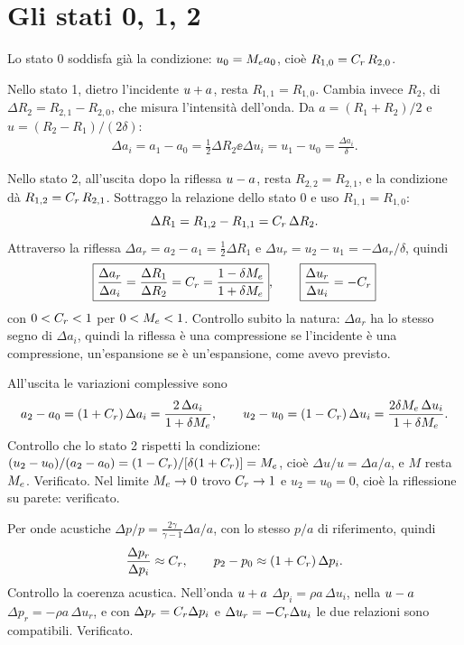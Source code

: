 \section*{Gli stati 0, 1, 2}
Lo stato 0 soddisfa già la condizione: $u_0=M_e a_0$, cioè $R_{1,0}=C_r\,R_{2,0}$.

Nello stato 1, dietro l'incidente $u+a$, resta $R_{1,1}=R_{1,0}$. Cambia invece $R_2$, di $\Delta R_2=R_{2,1}-R_{2,0}$,
che misura l'intensità dell'onda. Da $a=(R_1+R_2)/2$ e $u=(R_2-R_1)/(2\delta)$:
\begin{gather*}
  \Delta a_i=a_1-a_0=\tfrac12\Delta R_2 \ee \Delta u_i=u_1-u_0=\frac{\Delta a_i}{\delta}.
\end{gather*}

Nello stato 2, all'uscita dopo la riflessa $u-a$, resta $R_{2,2}=R_{2,1}$, e la condizione dà $R_{1,2}=C_r\,R_{2,1}$.
Sottraggo la relazione dello stato 0 e uso $R_{1,1}=R_{1,0}$:
\[
  \Delta R_1=R_{1,2}-R_{1,1}=C_r\,\Delta R_2 .
\]
Attraverso la riflessa $\Delta a_r=a_2-a_1=\tfrac12\Delta R_1$ e $\Delta u_r=u_2-u_1=-\Delta a_r/\delta$, quindi
\begin{gather*}
  \boxed{\frac{\Delta a_r}{\Delta a_i}=\frac{\Delta R_1}{\Delta R_2}=C_r=\frac{1-\delta M_e}{1+\delta M_e}}
  ,\qquad \boxed{\frac{\Delta u_r}{\Delta u_i}=-C_r}
\end{gather*}
con $0<C_r<1$ per $0<M_e<1$. Controllo subito la natura: $\Delta a_r$ ha lo stesso segno di $\Delta a_i$, quindi la
riflessa è una compressione se l'incidente è una compressione, un'espansione se è un'espansione, come avevo previsto.

All'uscita le variazioni complessive sono
\begin{gather*}
  a_2-a_0=(1+C_r)\,\Delta a_i=\frac{2\,\Delta a_i}{1+\delta M_e} ,\qquad
  u_2-u_0=(1-C_r)\,\Delta u_i=\frac{2\delta M_e\,\Delta u_i}{1+\delta M_e}.
\end{gather*}
Controllo che lo stato 2 rispetti la condizione: $(u_2-u_0)/(a_2-a_0)=(1-C_r)/[\delta(1+C_r)]=M_e$, cioè
$\Delta u/u=\Delta a/a$, e $M$ resta $M_e$. Verificato. Nel limite $M_e\to0$ trovo $C_r\to1$ e $u_2=u_0=0$, cioè la
riflessione su parete: verificato.

Per onde acustiche $\Delta p/p=\frac{2\gamma}{\gamma-1}\Delta a/a$, con lo stesso $p/a$ di riferimento, quindi
\begin{gather*}
  \frac{\Delta p_r}{\Delta p_i}\approx C_r ,\qquad p_2-p_0\approx(1+C_r)\,\Delta p_i .
\end{gather*}
Controllo la coerenza acustica. Nell'onda $u+a$ $\Delta p_i=\rho a\,\Delta u_i$, nella $u-a$ $\Delta p_r=-\rho a\,\Delta u_r$,
e con $\Delta p_r=C_r\Delta p_i$ e $\Delta u_r=-C_r\Delta u_i$ le due relazioni sono compatibili. Verificato.

